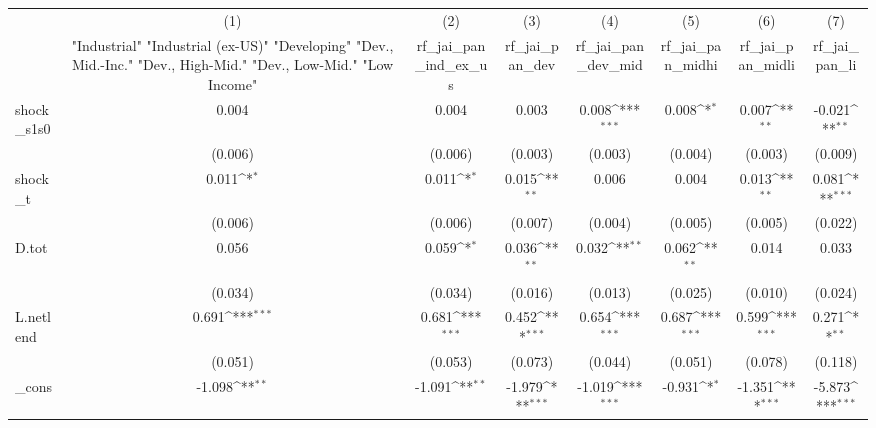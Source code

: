 {
\def\sym#1{\ifmmode^{#1}\else\(^{#1}\)\fi}
\begin{tabular}{l*{7}{c}}
\toprule
            &\multicolumn{1}{c}{(1)}&\multicolumn{1}{c}{(2)}&\multicolumn{1}{c}{(3)}&\multicolumn{1}{c}{(4)}&\multicolumn{1}{c}{(5)}&\multicolumn{1}{c}{(6)}&\multicolumn{1}{c}{(7)}\\
            &\multicolumn{1}{c}{ "Industrial" "Industrial (ex-US)" "Developing" "Dev., Mid.-Inc." "Dev., High-Mid."  "Dev., Low-Mid." "Low Income" }&\multicolumn{1}{c}{rf\_jai\_pan\_ind\_ex\_us}&\multicolumn{1}{c}{rf\_jai\_pan\_dev}&\multicolumn{1}{c}{rf\_jai\_pan\_dev\_mid}&\multicolumn{1}{c}{rf\_jai\_pan\_midhi}&\multicolumn{1}{c}{rf\_jai\_pan\_midli}&\multicolumn{1}{c}{rf\_jai\_pan\_li}\\
\midrule
shock\_s1s0  &       0.004         &       0.004         &       0.003         &       0.008\sym{***}&       0.008\sym{*}  &       0.007\sym{**} &      -0.021\sym{**} \\
            &     (0.006)         &     (0.006)         &     (0.003)         &     (0.003)         &     (0.004)         &     (0.003)         &     (0.009)         \\
\addlinespace
shock\_t     &       0.011\sym{*}  &       0.011\sym{*}  &       0.015\sym{**} &       0.006         &       0.004         &       0.013\sym{**} &       0.081\sym{***}\\
            &     (0.006)         &     (0.006)         &     (0.007)         &     (0.004)         &     (0.005)         &     (0.005)         &     (0.022)         \\
\addlinespace
D.tot       &       0.056         &       0.059\sym{*}  &       0.036\sym{**} &       0.032\sym{**} &       0.062\sym{**} &       0.014         &       0.033         \\
            &     (0.034)         &     (0.034)         &     (0.016)         &     (0.013)         &     (0.025)         &     (0.010)         &     (0.024)         \\
\addlinespace
L.netlend   &       0.691\sym{***}&       0.681\sym{***}&       0.452\sym{***}&       0.654\sym{***}&       0.687\sym{***}&       0.599\sym{***}&       0.271\sym{**} \\
            &     (0.051)         &     (0.053)         &     (0.073)         &     (0.044)         &     (0.051)         &     (0.078)         &     (0.118)         \\
\addlinespace
\_cons      &      -1.098\sym{**} &      -1.091\sym{**} &      -1.979\sym{***}&      -1.019\sym{***}&      -0.931\sym{*}  &      -1.351\sym{***}&      -5.873\sym{***}\\

\end{tabular}}
